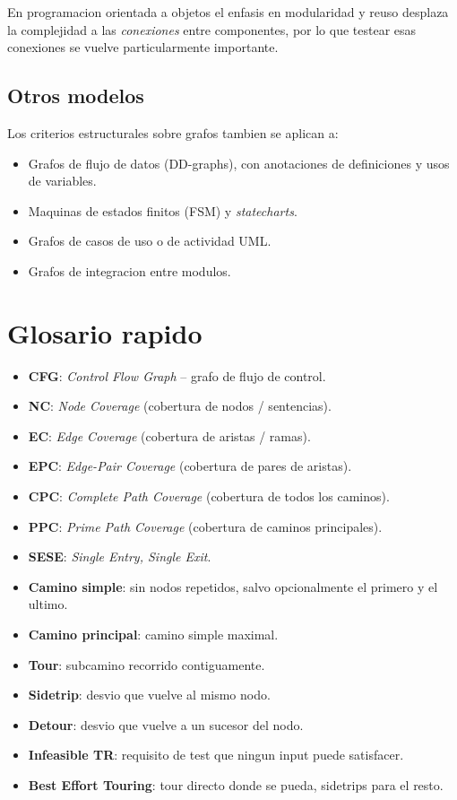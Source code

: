 \documentclass[12pt,a4paper]{article}
\begin{document}
En programacion orientada a objetos el enfasis en modularidad y reuso desplaza la complejidad a
las \emph{conexiones} entre componentes, por lo que testear esas conexiones se vuelve
particularmente importante.

\subsection{Otros modelos}

Los criterios estructurales sobre grafos tambien se aplican a:
\begin{itemize}
  \item Grafos de flujo de datos (DD-graphs), con anotaciones de definiciones y usos de
  variables.
  \item Maquinas de estados finitos (FSM) y \textit{statecharts}.
  \item Grafos de casos de uso o de actividad UML.
  \item Grafos de integracion entre modulos.
\end{itemize}

\section{Glosario rapido}

\begin{itemize}[itemsep=0.15em]
  \item \textbf{CFG}: \textit{Control Flow Graph} -- grafo de flujo de control.
  \item \textbf{NC}: \textit{Node Coverage} (cobertura de nodos / sentencias).
  \item \textbf{EC}: \textit{Edge Coverage} (cobertura de aristas / ramas).
  \item \textbf{EPC}: \textit{Edge-Pair Coverage} (cobertura de pares de aristas).
  \item \textbf{CPC}: \textit{Complete Path Coverage} (cobertura de todos los caminos).
  \item \textbf{PPC}: \textit{Prime Path Coverage} (cobertura de caminos principales).
  \item \textbf{SESE}: \textit{Single Entry, Single Exit}.
  \item \textbf{Camino simple}: sin nodos repetidos, salvo opcionalmente el primero y el ultimo.
  \item \textbf{Camino principal}: camino simple maximal.
  \item \textbf{Tour}: subcamino recorrido contiguamente.
  \item \textbf{Sidetrip}: desvio que vuelve al mismo nodo.
  \item \textbf{Detour}: desvio que vuelve a un sucesor del nodo.
  \item \textbf{Infeasible TR}: requisito de test que ningun input puede satisfacer.
  \item \textbf{Best Effort Touring}: tour directo donde se pueda, sidetrips para el resto.
\end{itemize}
\end{document}
